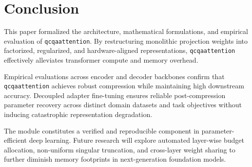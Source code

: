 \section{Conclusion}
This paper formalized the architecture, mathematical formulations, and empirical evaluation of \texttt{qcqaattention}. By restructuring monolithic projection weights into factorized, regularized, and hardware-aligned representations, \texttt{qcqaattention} effectively alleviates transformer compute and memory overhead.

Empirical evaluations across encoder and decoder backbones confirm that \texttt{qcqaattention} achieves robust compression while maintaining high downstream accuracy. Decoupled adapter fine-tuning ensures reliable post-compression parameter recovery across distinct domain datasets and task objectives without inducing catastrophic representation degradation.

The module constitutes a verified and reproducible component in parameter-efficient deep learning. Future research will explore automated layer-wise budget allocation, non-uniform singular truncation, and cross-layer weight sharing to further diminish memory footprints in next-generation foundation models.

